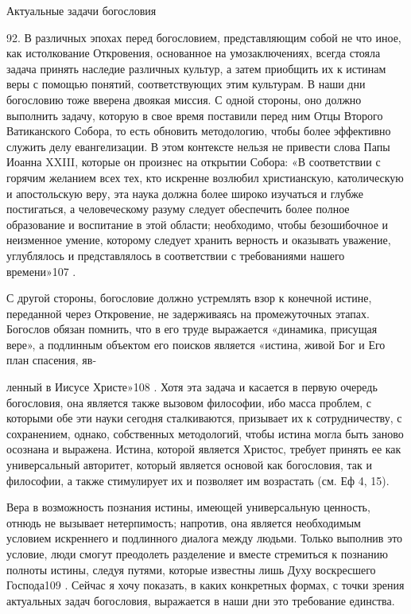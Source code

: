 \documentclass[a5paper,10pt]{article}
\begin{document}
Актуальные задачи богословия

92. В различных эпохах перед богословием, представляющим собой не что иное, как
истолкование Откровения, основанное на умозаключениях, всегда стояла задача
принять наследие различных культур, а затем приобщить их к истинам веры с
помощью понятий, соответствующих этим культурам. В наши дни богословию тоже
вверена двоякая миссия. С одной стороны, оно должно выполнить задачу, которую в
свое время поставили перед ним Отцы Второго Ватиканского Собора, то есть
обновить методологию, чтобы более эффективно служить делу евангелизации. В этом
контексте нельзя не привести слова Папы Иоанна XXIII, которые он произнес на
открытии Собора: «В соответствии с горячим желанием всех тех, кто искренне
возлюбил христианскую, католическую и апостольскую веру, эта наука должна более
широко изучаться и глубже постигаться, а человеческому разуму следует
обеспечить более полное образование и воспитание в этой области; необходимо,
чтобы безошибочное и неизменное умение, которому следует хранить верность и
оказывать уважение, углублялось и представлялось в соответствии с требованиями
нашего времени»107 .

С другой стороны, богословие должно устремлять взор к конечной истине,
переданной через Откровение, не задерживаясь на промежуточных этапах. Богослов
обязан помнить, что в его труде выражается «динамика, присущая вере», а
подлинным объектом его поисков является «истина, живой Бог и Его план спасения,
яв-

ленный в Иисусе Христе»108 . Хотя эта задача и касается в первую очередь
богословия, она является также вызовом философии, ибо масса проблем, с которыми
обе эти науки сегодня сталкиваются, призывает их к сотрудничеству, с
сохранением, однако, собственных методологий, чтобы истина могла быть заново
осознана и выражена. Истина, которой является Христос, требует принять ее как
универсальный авторитет, который является основой как богословия, так и
философии, а также стимулирует их и позволяет им возрастать (см. Еф 4, 15).

Вера в возможность познания истины, имеющей универсальную ценность, отнюдь не
вызывает нетерпимость; напротив, она является необходимым условием искреннего и
подлинного диалога между людьми. Только выполнив это условие, люди смогут
преодолеть разделение и вместе стремиться к познанию полноты истины, следуя
путями, которые известны лишь Духу воскресшего Господа109 . Сейчас я хочу
показать, в каких конкретных формах, с точки зрения актуальных задач
богословия, выражается в наши дни это требование единства.
\end{document}

